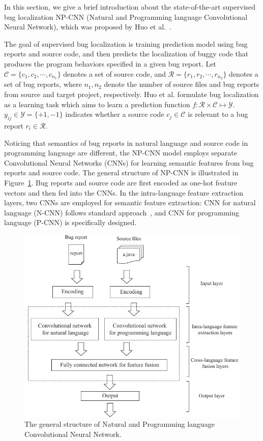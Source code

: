In this section, we give a brief introduction about the state-of-the-art supervised bug localization NP-CNN (Natural and Programming language Convolutional Neural Network), which was proposed by Huo et al.~\cite{huo2016learning}. %

The goal of supervised bug localization is training prediction model using bug reports and source code,  and then predicts the localization of buggy code that produces the program behaviors specified in a given bug report. Let $\mathcal{C} =\{ c_1, c_2, \cdots, c_{n_1} \}$ denotes a set of source code, and $\mathcal{R} =\{ r_1, r_2, \cdots, r_{n_2}\} $ denotes a set of bug reports, where $n_1, n_2$ denote the number of source files and bug reports from source and target project, respectively. Huo et al. formulate bug localization as a learning task which aims to learn a prediction function $f: \mathcal{R} \times \mathcal{C} \mapsto \mathcal{Y}$. $y_{ij} \in \mathcal{Y} = \{+1, -1 \}$ indicates whether a source code $c_j \in \mathcal{C} $ is relevant to a bug report $r_i \in \mathcal{R}$.

Noticing that semantics of bug reports in natural language and source code in programming language are different, the NP-CNN model employs separate Convolutional Neural Networks (CNNs) for learning semantic features from bug reports and source code. The general structure of NP-CNN is illustrated in Figure~\ref{fig:npcnn-structure}. Bug reports and source code are first encoded as one-hot feature vectors and then fed into the CNNs. In the intra-language feature extraction layers, two CNNs are employed for semantic feature extraction: CNN for natural language (N-CNN) follows standard approach~\cite{kim2014convolutional}, and CNN for programming language (P-CNN) is specifically designed. 

\begin{figure}[hbt]
\centering
\includegraphics[width = \columnwidth]{pic/NPCNN-structure.pdf}
\caption{The general structure of Natural and Programming language Convolutional Neural Network.}
\label{fig:npcnn-structure}
\end{figure}

